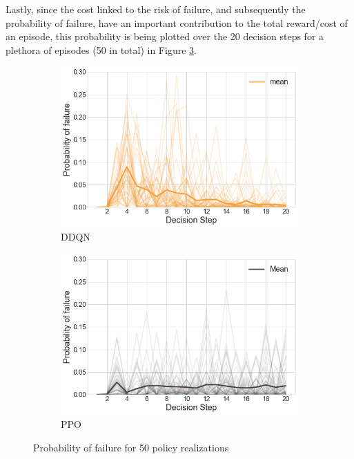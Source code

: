 \newpage

Lastly, since the cost linked to the risk of failure, and subsequently the probability of failure, have an important contribution to the total reward/cost of an episode, this probability is being plotted over the 20 decision steps for a plethora of episodes (50 in total) in Figure \ref{pfs}.

\begin{figure}[H]
    \centering
    \begin{subfigure}[b]{0.48\textwidth}
        \centering
        \includegraphics[width=\textwidth]{Figures/pfsDDQN.png}
        \caption{\gls{DDQN}}
        \label{pfDDQN}
    \end{subfigure}
    \begin{subfigure}[b]{0.48\textwidth}
        \centering
        \includegraphics[width=\textwidth]{Figures/pfsPPO.png}
        \caption{\gls{PPO}}
        \label{pfPPO}
    \end{subfigure}
    \caption{Probability of failure for 50 policy realizations}
    \label{pfs}
\end{figure}

